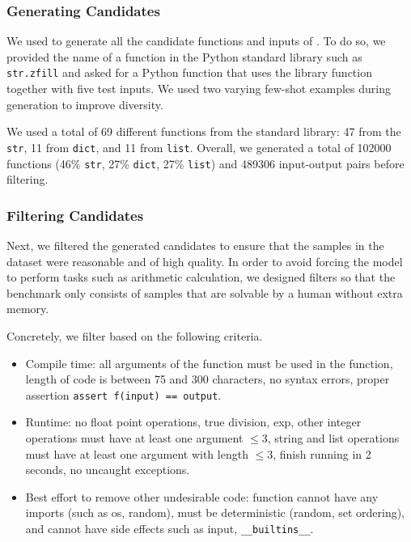 \subsubsection{Generating Candidates} \label{subsec:generating-candidates}
We used \codellamalarge to generate all the candidate functions and inputs of \benchmark. To do so, we provided the name of a function in the Python standard library such as \texttt{str.zfill} and asked for a Python function that uses the library function together with five test inputs. We used two varying few-shot examples during generation to improve diversity.

We used a total of 69 different functions from the standard library: 47 from the \texttt{str}, 11 from \texttt{dict}, and 11 from \texttt{list}. Overall, we generated a total of 102000 functions (46\% \texttt{str}, 27\% \texttt{dict}, 27\% \texttt{list}) and 489306 input-output pairs before filtering.


\subsubsection{Filtering Candidates} \label{subsec:filtering-candidates}
Next, we filtered the generated candidates to ensure that the samples in the dataset were reasonable and of high quality. In order to avoid forcing the model to perform tasks such as arithmetic calculation, we designed filters so that the benchmark only consists of samples that are solvable by a human without extra memory.

Concretely, we filter based on the following criteria.
\begin{itemize}
    \item Compile time: all arguments of the function must be used in the function, length of code is between 75 and 300 characters, no syntax errors, proper assertion \texttt{assert f(input) == output}.

    \item Runtime: no float point operations, true division, exp, other integer operations must have at least one argument $\leq 3$, string and list operations must have at least one argument with length $\leq 3$, finish running in 2 seconds, no uncaught exceptions.

    \item Best effort to remove other undesirable code: function cannot have any imports (such as os, random), must be deterministic (random, set ordering), and cannot have side effects such as input, \texttt{\_\_builtins\_\_}.
\end{itemize}

